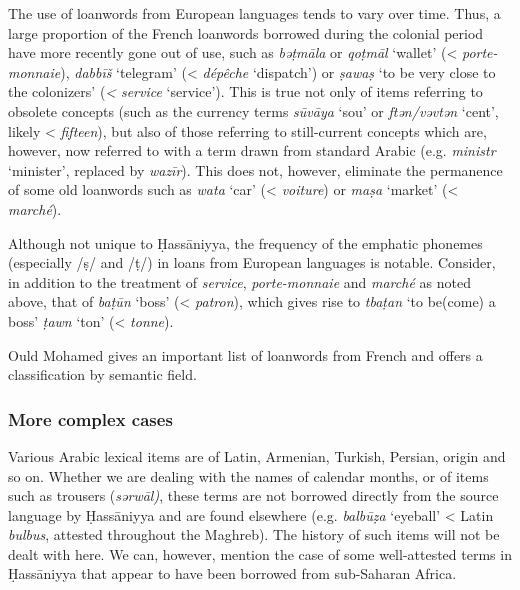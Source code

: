 \documentclass[output=paper]{langsci/langscibook}
\begin{document}

The use of loanwords from European languages tends to vary over time. Thus, a large proportion of the French loanwords borrowed during the colonial period have more recently gone out of use, such as \textit{bə{\R}ṭmāla} or \textit{qo{\R}ṭmāl} ‘wallet’ (< \textit{porte-monnaie}), \textit{dabbīš} ‘telegram’ (< \textit{dépêche} ‘dispatch’) or \textit{ṣa{\R}waṣ} ‘to be very close to the colonizers’ (\textit{<} \textit{service} ‘service’). This is true not only of items referring to obsolete concepts (such as the currency terms \textit{sūvāya} ‘sou’ or \textit{ftən/vəvtən} ‘cent’, likely < \textit{fifteen}), but also of those referring to still-current concepts which are, however, now referred to with a term drawn from standard Arabic (e.g. \textit{ministr} ‘minister’, replaced by \textit{wazīr}). This does not, however, eliminate the permanence of some old loanwords such as \textit{wata} ‘car’ (< \textit{voiture}) or \textit{ma{\R}ṣa} ‘market’ (< \textit{marché}).

Although not unique to Ḥassāniyya, the frequency of the emphatic phonemes (especially /ṣ/ and /ṭ/) in loans from European languages is notable. Consider, in addition to the treatment of \textit{service}, \textit{porte-monnaie} and \textit{marché} as noted above, that of \textit{baṭ{\R}ūn} ‘boss’ (< \textit{patron}), which gives rise to \textit{tbaṭ{\R}an} ‘to be(come) a boss’ \textit{ṭawn} ‘ton’ (< \textit{tonne}).

Ould Mohamed \citet{Baba2003} gives an important list of loanwords from French and offers a classification by semantic field. 

\subsubsection{ More complex cases} %


Various Arabic lexical items are of Latin, Armenian, Turkish, Persian, origin and so on. Whether we are dealing with the names of calendar months, or of items such as trousers (\textit{sərwāl)}, these terms are not borrowed directly from the source language by Ḥassāniyya and are found elsewhere (e.g. \textit{balbūẓa} ‘eyeball’ < Latin \textit{bulbus}, attested throughout the Maghreb). The history of such items will not be dealt with here. We can, however, mention the case of some well-attested terms in Ḥassāniyya that appear to have been borrowed from sub-Saharan Africa.
\end{document}
